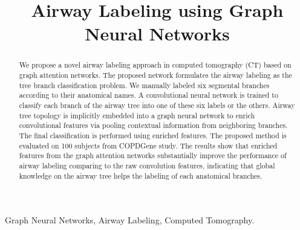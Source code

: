 \documentclass{midl} %
\title[Airway Labeling using Graph Neural Networks ]{Airway Labeling using Graph Neural Networks}
\begin{document}
\maketitle

\begin{abstract}
We propose a novel airway labeling approach in computed tomography (CT) based on graph attention networks. The proposed network formulates the airway labeling as the tree branch classification problem. We manually labeled six segmental branches according to their anatomical names. A convolutional neural network is  trained to classify each branch of the airway tree into one of these six labels or the others. Airway tree topology is implicitly embedded into a graph neural network to enrich convolutional features via pooling contextual information from neighboring branches. The final classification is performed using enriched features. The proposed method is evaluated on 100 subjects from COPDGene study. The results show that enriched features from the graph attention networks substantially improve the performance of airway labeling comparing to the raw convolution features, indicating that global knowledge on the airway tree helps the labeling of each anatomical branches.
\end{abstract}

\begin{keywords}
Graph Neural Networks, Airway Labeling, Computed Tomography.
\end{keywords}
\end{document}
